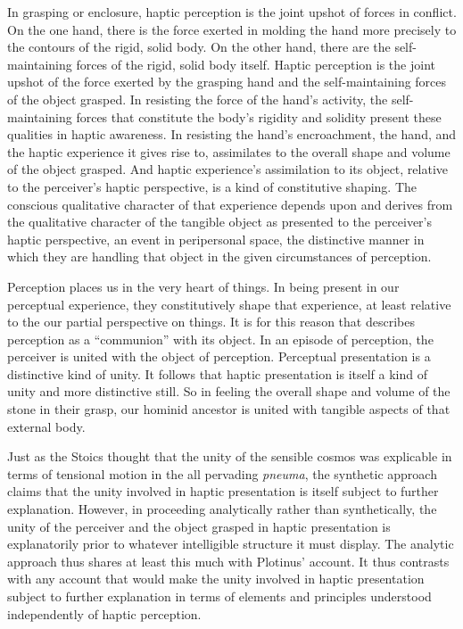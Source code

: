 In grasping or enclosure, haptic perception is the joint upshot of forces in conflict. On the one hand, there is the force exerted in molding the hand more precisely to the contours of the rigid, solid body. On the other hand, there are the self-maintaining forces of the rigid, solid body itself. Haptic perception is the joint upshot of the force exerted by the grasping hand and the self-maintaining forces of the object grasped. In resisting the force of the hand's activity, the self-maintaining forces that constitute the body's rigidity and solidity present these qualities in haptic awareness. In resisting the hand's encroachment, the hand, and the haptic experience it gives rise to, assimilates to the overall shape and volume of the object grasped. And haptic experience's assimilation to its object, relative to the perceiver's haptic perspective, is a kind of constitutive shaping. The conscious qualitative character of that experience depends upon and derives from the qualitative character of the tangible object as presented to the perceiver's haptic perspective, an event in peripersonal space, the distinctive manner in which they are handling that object in the given circumstances of perception.

Perception places us in the very heart of things. In being present in our perceptual experience, they constitutively shape that experience, at least relative to the our partial perspective on things. It is for this reason that \citet{Ardley:1958aa} describes perception as a ``communion'' with its object. In an episode of perception, the perceiver is united with the object of perception. Perceptual presentation is a distinctive kind of unity. It follows that haptic presentation is itself a kind of unity and more distinctive still. So in feeling the overall shape and volume of the stone in their grasp, our hominid ancestor is united with tangible aspects of that external body.

Just as the Stoics thought that the unity of the sensible cosmos was explicable in terms of tensional motion in the all pervading \emph{pneuma}, the synthetic approach claims that the unity involved in haptic presentation is itself subject to further explanation. However, in proceeding analytically rather than synthetically, the unity of the perceiver and the object grasped in haptic presentation is explanatorily prior to whatever intelligible structure it must display. The analytic approach thus shares at least this much with Plotinus' account. It thus contrasts with any account that would make the unity involved in haptic presentation subject to further explanation in terms of elements and principles understood independently of haptic perception. 

